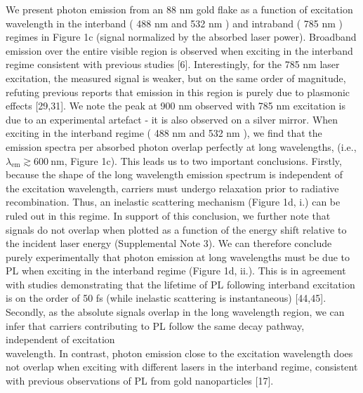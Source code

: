 \documentclass[10pt]{article}
\begin{document}
We present photon emission from an 88 nm gold flake as a function of excitation wavelength in the interband ( 488 nm and 532 nm ) and intraband ( 785 nm ) regimes in Figure 1c (signal normalized by the absorbed laser power). Broadband emission over the entire visible region is observed when exciting in the interband regime consistent with previous studies [6]. Interestingly, for the 785 nm laser excitation, the measured signal is weaker, but on the same order of magnitude, refuting previous reports that emission in this region is purely due to plasmonic effects [29,31]. We note the peak at 900 nm observed with 785 nm excitation is due to an experimental artefact - it is also observed on a silver mirror. When exciting in the interband regime ( 488 nm and 532 nm ), we find that the emission spectra per absorbed photon overlap perfectly at long wavelengths, (i.e., $\lambda_{\mathrm{em}} \gtrsim 600 \mathrm{~nm}$, Figure 1c). This leads us to two important conclusions. Firstly, because the shape of the long wavelength emission spectrum is independent of the excitation wavelength, carriers must undergo relaxation prior to radiative recombination. Thus, an inelastic scattering mechanism (Figure 1d, i.) can be ruled out in this regime. In support of this conclusion, we further note that signals do not overlap when plotted as a function of the energy shift relative to the incident laser energy (Supplemental Note 3). We can therefore conclude purely experimentally that photon emission at long wavelengths must be due to PL when exciting in the interband regime (Figure 1d, ii.). This is in agreement with studies demonstrating that the lifetime of PL following interband excitation is on the order of 50 fs (while inelastic scattering is instantaneous) [44,45]. Secondly, as the absolute signals overlap in the long wavelength region, we can infer that carriers contributing to PL follow the same decay pathway, independent of excitation\\[0pt]
wavelength. In contrast, photon emission close to the excitation wavelength does not overlap when exciting with different lasers in the interband regime, consistent with previous observations of PL from gold nanoparticles [17].
\end{document}
